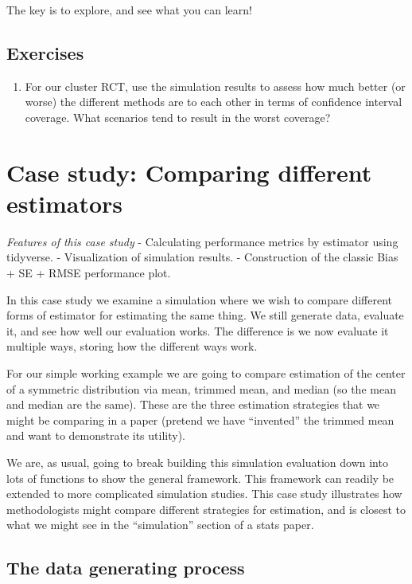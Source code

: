 \documentclass[
]{book}
\providecommand{\tightlist}{%
  \setlength{\itemsep}{0pt}\setlength{\parskip}{0pt}}
\begin{document}
The key is to explore, and see what you can learn!

\hypertarget{exercises-4}{%
\section{Exercises}\label{exercises-4}}

\begin{enumerate}
\def\labelenumi{\arabic{enumi})}
\tightlist
\item
  For our cluster RCT, use the simulation results to assess how much better (or worse) the different methods are to each other in terms of confidence interval coverage. What scenarios tend to result in the worst coverage?
\end{enumerate}

\hypertarget{case-study-comparing-different-estimators}{%
\chapter{Case study: Comparing different estimators}\label{case-study-comparing-different-estimators}}

\emph{Features of this case study}
- Calculating performance metrics by estimator using tidyverse.
- Visualization of simulation results.
- Construction of the classic Bias + SE + RMSE performance plot.

In this case study we examine a simulation where we wish to compare different forms of
estimator for estimating the same thing. We still generate data, evaluate it,
and see how well our evaluation works. The difference is we now evaluate it
multiple ways, storing how the different ways work.

For our simple working example we are going to compare estimation of the
center of a symmetric distribution via mean, trimmed mean, and median (so the
mean and median are the same). These are the three estimation strategies
that we might be comparing in a paper (pretend we have ``invented'' the trimmed
mean and want to demonstrate its utility).

We are, as usual, going to break building this simulation evaluation down into lots of
functions to show the general framework. This framework can readily be
extended to more complicated simulation studies.
This case study illustrates how methodologists might compare different strategies for estimation, and is
closest to what we might see in the ``simulation'' section of a stats paper.

\hypertarget{the-data-generating-process}{%
\section{The data generating process}\label{the-data-generating-process}}
\end{document}

